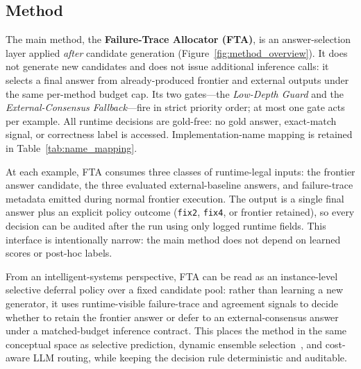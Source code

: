 \subsection{Method}
\label{sec:method}

The main method, the \textbf{Failure-Trace Allocator (FTA)}, is an
answer-selection layer applied \emph{after} candidate generation
(Figure~\ref{fig:method_overview}).
It does not generate new candidates and does not issue additional inference
calls: it selects a final answer from already-produced frontier and external
outputs under the same per-method budget cap.
Its two gates---the \emph{Low-Depth Guard} and the
\emph{External-Consensus Fallback}---fire in strict priority order; at most
one gate acts per example.
All runtime decisions are gold-free: no gold answer, exact-match signal, or
correctness label is accessed.
Implementation-name mapping is retained in Table~\ref{tab:name_mapping}.

At each example, FTA consumes three classes of runtime-legal inputs:
the frontier answer candidate, the three evaluated external-baseline answers,
and failure-trace metadata emitted during normal frontier execution.
The output is a single final answer plus an explicit policy outcome
(\texttt{fix2}, \texttt{fix4}, or frontier retained), so every decision can be
audited after the run using only logged runtime fields.
This interface is intentionally narrow: the main method does not depend on
learned scores or post-hoc labels.

From an intelligent-systems perspective, FTA can be read as an
instance-level selective deferral policy over a fixed candidate pool:
rather than learning a new generator, it uses runtime-visible
failure-trace and agreement signals to decide whether to retain the
frontier answer or defer to an external-consensus answer under a
matched-budget inference contract.
This places the method in the same conceptual space as selective
prediction, dynamic ensemble selection~\citep{cruz2015metades}, and cost-aware LLM routing, while
keeping the decision rule deterministic and auditable.

